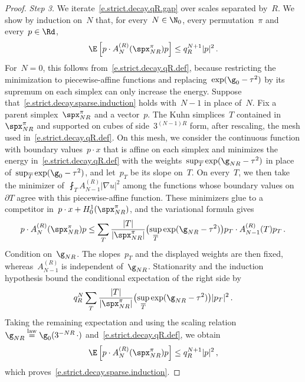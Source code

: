 \documentclass[11pt]{amsart}
\begin{document}
\begin{proof}
	\emph{Step 3.} We iterate~\eqref{e.strict.decay.qR.gap} over scales separated by~$R$. We show by induction on~$N$ that, for every~$N\in\N_0$, every permutation~$\pi$ and every~$p\in\Rd$,
	\begin{equation}
		\E\left[
		p\cdot A_N^{(R)}(\spx_{NR}^{\pi})p
		\right]
		\leq q_R^{N+1}|p|^2\,.
		\label{e.strict.decay.sparse.induction}
	\end{equation}
	For~$N=0$, this follows from~\eqref{e.strict.decay.qR.def}, because restricting the minimization to piecewise-affine functions and replacing~$\exp(\g_0-\tau^2)$ by its supremum on each simplex can only increase the energy. Suppose that~\eqref{e.strict.decay.sparse.induction} holds with~$N-1$ in place of~$N$. Fix a parent simplex~$\spx_{NR}^\pi$ and a vector~$p$.  The Kuhn simplices~$T$ contained in~$\spx_{NR}^\pi$ and supported on cubes of side~$3^{(N-1)R}$ form, after rescaling, the mesh used in~\eqref{e.strict.decay.qR.def}.  On this mesh, we consider the continuous function with boundary values~$p\cdot x$ that is affine on each simplex and minimizes the energy in~\eqref{e.strict.decay.qR.def} with the weights~$\sup_{\overline T}\exp(\g_{NR}-\tau^2)$ in place of~$\sup_{\overline T}\exp(\g_0-\tau^2)$, and let~$p_T$ be its slope on~$T$.  On every~$T$, we then take the minimizer of~$\fint_TA_{N-1}^{(R)}|\nabla u|^2$ among the functions whose boundary values on~$\partial T$ agree with this piecewise-affine function.  These minimizers glue to a competitor in~$p\cdot x+H_0^1(\spx_{NR}^\pi)$, and the variational formula gives
	\begin{equation*}
		p\cdot A_N^{(R)}(\spx_{NR}^\pi)p
		\leq
		\sum_T\frac{|T|}{|\spx_{NR}^\pi|}
		\bigl(\sup_{\overline T}\exp(\g_{NR}-\tau^2)\bigr)
		p_T\cdot A_{N-1}^{(R)}(T)p_T\,.
	\end{equation*}
	Condition on~$\g_{NR}$.  The slopes~$p_T$ and the displayed weights are then fixed, whereas~$A_{N-1}^{(R)}$ is independent of~$\g_{NR}$.  Stationarity and the induction hypothesis bound the conditional expectation of the right side by
	\begin{equation*}
		q_R^N
		\sum_T\frac{|T|}{|\spx_{NR}^\pi|}
		\bigl(\sup_{\overline T}\exp(\g_{NR}-\tau^2)\bigr)|p_T|^2\,.
	\end{equation*}
	Taking the remaining expectation and using the scaling relation~$\g_{NR}\overset{\mathrm{law}}=\g_0(3^{-NR}\,\cdot)$ and~\eqref{e.strict.decay.qR.def}, we obtain
	\begin{equation*}
		\E\left[
		p\cdot A_N^{(R)}(\spx_{NR}^\pi)p
		\right]
		\leq q_R^{N+1}|p|^2\,,
	\end{equation*}
	which proves~\eqref{e.strict.decay.sparse.induction}.


\end{proof}
\end{document}
